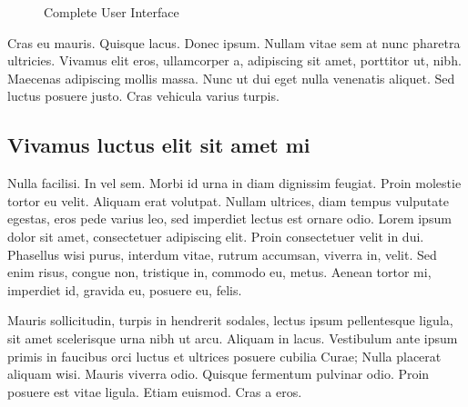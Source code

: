 \begin{figure}[htbp]
	\centering
	 \qquad
	\caption{Complete User Interface}
	\label{fig:user_interface}
\end{figure}

Cras eu mauris. Quisque lacus. Donec ipsum. Nullam vitae sem at nunc pharetra ultricies. Vivamus elit eros, ullamcorper a, adipiscing sit amet, porttitor ut, nibh. Maecenas adipiscing mollis massa. Nunc ut dui eget nulla venenatis aliquet. Sed luctus posuere justo. Cras vehicula varius turpis. 
\subsection{Vivamus luctus elit sit amet mi}
Nulla facilisi. In vel sem. Morbi id urna in diam dignissim feugiat. Proin molestie tortor eu velit. Aliquam erat volutpat. Nullam ultrices, diam tempus vulputate egestas, eros pede varius leo, sed imperdiet lectus est ornare odio. Lorem ipsum dolor sit amet, consectetuer adipiscing elit. Proin consectetuer velit in dui. Phasellus wisi purus, interdum vitae, rutrum accumsan, viverra in, velit. Sed enim risus, congue non, tristique in, commodo eu, metus. Aenean tortor mi, imperdiet id, gravida eu, posuere eu, felis. 

Mauris sollicitudin, turpis in hendrerit sodales, lectus ipsum pellentesque ligula, sit amet scelerisque urna nibh ut arcu. Aliquam in lacus. Vestibulum ante ipsum primis in faucibus orci luctus et ultrices posuere cubilia Curae; Nulla placerat aliquam wisi. Mauris viverra odio. Quisque fermentum pulvinar odio. Proin posuere est vitae ligula. Etiam euismod. Cras a eros.